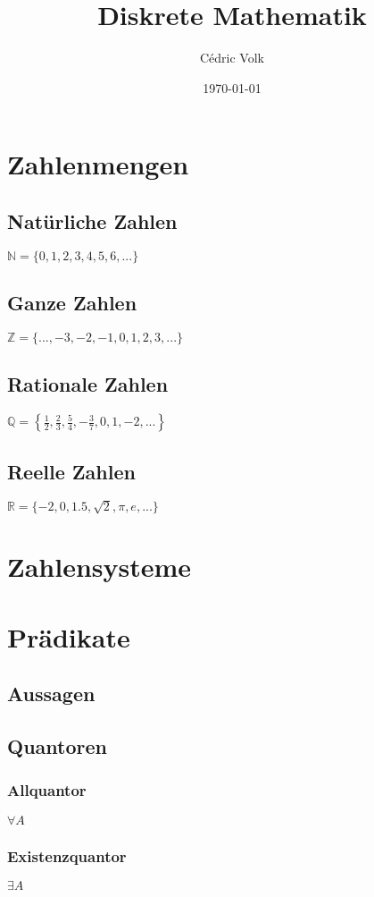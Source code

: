 \documentclass[a4paper,10pt]{article}
\title{Diskrete Mathematik}
\author{Cédric Volk}
\date{\today}
\begin{document}
\maketitle

\tableofcontents
\newpage
\section{Zahlenmengen}
\subsection{Natürliche Zahlen}
\(\mathbb{N} = \{0,1,2,3,4,5,6,...\}\)

\subsection{Ganze Zahlen}
\(\mathbb{Z} = \{...,-3,-2,-1,0,1,2,3,...\}\)
\subsection{Rationale Zahlen}
\(\mathbb{Q} = \left\{ \frac{1}{2}, \frac{2}{3}, \frac{5}{4}, -\frac{3}{7}, 0, 1, -2, ... \right\}\)
\subsection{Reelle Zahlen}
\(\mathbb{R} = \{ -2, 0, 1.5, \sqrt{2}, \pi, e, ... \}\)

\section{Zahlensysteme}

\section{Prädikate}
\subsection{Aussagen}
\subsection{Quantoren}
\subsubsection{Allquantor}
\(\forall A\)
\subsubsection{Existenzquantor}
\(\exists A\)
\end{document}
